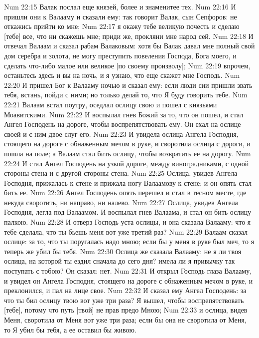 \rsbpar\vs Num 22:15 Валак послал еще князей, более и знаменитее тех.
\vs Num 22:16 И пришли они к Валааму и сказали ему: так говорит Валак, сын Сепфоров: не откажись прийти ко мне;
\vs Num 22:17 я окажу тебе великую почесть и сделаю [тебе] все, что ни скажешь мне; приди же, прокляни мне народ сей.
\vs Num 22:18 И отвечал Валаам и сказал рабам Валаковым: хотя бы Валак давал мне полный свой дом серебра и золота, не могу преступить повеления Господа, Бога моего, и сделать что-либо малое или великое [по своему произволу];
\vs Num 22:19 впрочем, останьтесь здесь и вы на ночь, и я узнаю, что еще скажет мне Господь.
\vs Num 22:20 И пришел Бог к Валааму ночью и сказал ему: если люди сии пришли звать тебя, встань, пойди с ними; но только делай то, что Я буду говорить тебе.
\vs Num 22:21 Валаам встал поутру, оседлал ослицу свою и пошел с князьями Моавитскими.
\vs Num 22:22 И воспылал гнев Божий за то, что он пошел, и стал Ангел Господень на дороге, чтобы воспрепятствовать ему. Он ехал на ослице своей и с ним двое слуг его.
\vs Num 22:23 И увидела ослица Ангела Господня, стоящего на дороге с обнаженным мечом в руке, и своротила ослица с дороги, и пошла на поле; а Валаам стал бить ослицу, чтобы возвратить ее на дорогу.
\vs Num 22:24 И стал Ангел Господень на узкой дороге, между виноградниками,  с одной стороны стена и с другой стороны стена.
\vs Num 22:25 Ослица, увидев Ангела Господня, прижалась к стене и прижала ногу Валаамову к стене; и он опять стал бить ее.
\vs Num 22:26 Ангел Господень опять перешел и стал в тесном месте, где некуда своротить, ни направо, ни налево.
\vs Num 22:27 Ослица, увидев Ангела Господня, легла под Валаамом. И воспылал гнев Валаама, и стал он бить ослицу палкою.
\vs Num 22:28 И отверз Господь уста ослицы, и она сказала Валааму: что я тебе сделала, что ты бьешь меня вот уже третий раз?
\vs Num 22:29 Валаам сказал ослице: за то, что ты поругалась надо мною; если бы у меня в руке был меч, то я теперь же убил бы тебя.
\vs Num 22:30 Ослица же сказала Валааму: не я ли твоя ослица, на которой ты ездил сначала до сего дня? имела ли я привычку так поступать с тобою? Он сказал: нет.
\vs Num 22:31 И открыл Господь глаза Валааму, и увидел он Ангела Господня, стоящего на дороге с обнаженным мечом в руке, и преклонился, и пал на лице свое.
\vs Num 22:32 И сказал ему Ангел Господень: за что ты бил ослицу твою вот уже три раза? Я вышел, чтобы воспрепятствовать [тебе], потому что путь [твой] не прав предо Мною;
\vs Num 22:33 и ослица, видев Меня, своротила от Меня вот уже три раза; если бы она не своротила от Меня, то Я убил бы тебя, а ее оставил бы живою.
